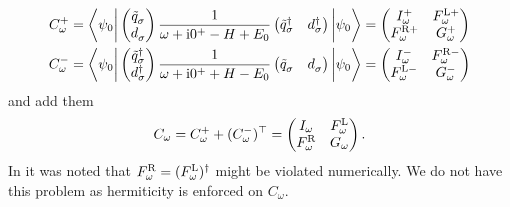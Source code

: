 \begin{subequations}
    \begin{align}
        C^+_\omega
         & =
        \biggl\langle \psi_0 \biggr|
        \begin{pmatrix}
            \tilde q^{\pdag}_\sigma \\
            d^{\pdag}_\sigma
        \end{pmatrix}
        \frac{1}{\omega + \mi0^+ - H + E_0}
        \begin{pmatrix}
            \tilde q^\dag_\sigma & d^\dag_\sigma
        \end{pmatrix}
        \biggl| \psi_0 \biggr\rangle
        =
        \begin{pmatrix}
            I^+_\omega      & F^{\mL+}_\omega \\
            F^{\mR+}_\omega & G^+_\omega
        \end{pmatrix} \\
        C^-_\omega
         & =
        \biggl\langle \psi_0 \biggr|
        \begin{pmatrix}
            \tilde q^\dag_\sigma \\
            d^\dag_\sigma
        \end{pmatrix}
        \frac{1}{\omega + \mi0^+ + H - E_0}
        \begin{pmatrix}
            \tilde q^{\pdag}_\sigma & d^{\pdag}_\sigma
        \end{pmatrix}
        \biggl| \psi_0 \biggr\rangle
        =
        \begin{pmatrix}
            I^-_\omega      & F^{\mR-}_\omega \\
            F^{\mL-}_\omega & G^-_\omega
        \end{pmatrix}
    \end{align}
\end{subequations}
and add them
\begin{equation}
    C_\omega
    =
    C^+_\omega + (C^-_\omega)^\top
    =
    \begin{pmatrix}
        I_\omega       & F^{\mathrm{L}}_\omega \\
        F^{\mathrm{R}}_\omega & G_\omega
    \end{pmatrix}.
\end{equation}
In \cite{Kugler2022} it was noted that $F^{\mathrm{R}}_\omega = (F^{\mathrm{L}}_\omega)^\dag$
might be violated numerically.
We do not have this problem as hermiticity is enforced on $C_\omega$.

